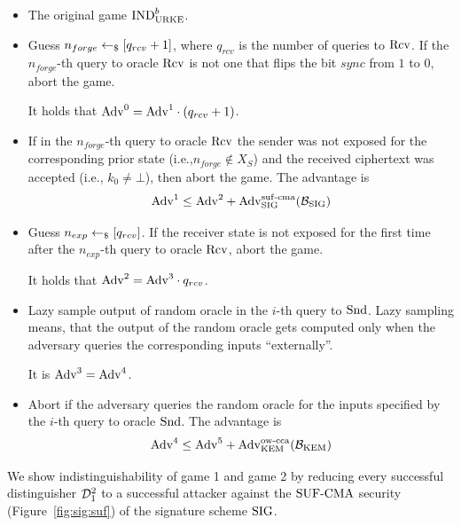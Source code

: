 \begin{itemize}[leftmargin=2.0cm]
    \item[Game 0:] The original game ${\mathrm{IND}}_{\mathrm{URKE}}^b$.
    \item[Game 1:] Guess $n_{forge}\gets_\$ [q_{rcv}+1]$, where $q_{rcv}$ is the number of queries to $\mathrm{Rcv}$.
        If the $n_{forge}$-th query to oracle $\mathrm{Rcv}$ is not one that flips the bit $\mathit{sync}$ from $1$ to $0$, abort the game.

        It holds that $\mathrm{Adv}^0=\mathrm{Adv}^1\cdot(q_{rcv}+1)$.
    \item[Game 2:] If in the $n_{forge}$-th query to oracle $\mathrm{Rcv}$ the sender was not exposed for the corresponding prior state (i.e.,$n_{forge}\notin X_S$) and the received ciphertext was accepted (i.e., $k_0\neq\bot$), then abort the game.
        The advantage is
        \[\mathrm{Adv}^1\leq\mathrm{Adv}^2 + \mathrm{Adv}_{\mathrm{SIG}}^{\mathrm{suf}\text{-}\mathrm{cma}}(\mathcal{B}_{\mathrm{SIG}})\]
    \item[Game 3:] Guess $n_{exp}\gets_\$ [q_{rcv}]$.
        If the receiver state is not exposed for the first time after the $n_{exp}$-th query to oracle $\mathrm{Rcv}$, abort the game.

        It holds that $\mathrm{Adv}^2=\mathrm{Adv}^3\cdot q_{rcv}$.
        
    \item[Game 4:] Lazy sample output of random oracle in the $i$-th query to $\mathrm{Snd}$.
        Lazy sampling means, that the output of the random oracle gets computed only when the adversary queries the corresponding inputs ``externally''. 

        It is $\mathrm{Adv}^3=\mathrm{Adv}^4$.
    \item[Game 5:] Abort if the adversary queries the random oracle for the inputs specified by the $i$-th query to oracle $\mathrm{Snd}$.
        The advantage is
        \[\mathrm{Adv}^4\leq\mathrm{Adv}^5 + \mathrm{Adv}_{\mathrm{KEM}}^{\mathrm{ow}\text{-}\mathrm{cca}}(\mathcal{B}_{\mathrm{KEM}})\]
\end{itemize}

We show indistinguishability of game 1 and game 2 by reducing every successful distinguisher $\mathcal{D}_1^2$ to a successful attacker against the ${\mathrm{SUF}\text{-}\mathrm{CMA}}$ security (Figure~\ref{fig:sig:suf}) of the signature scheme $\mathrm{SIG}$.

